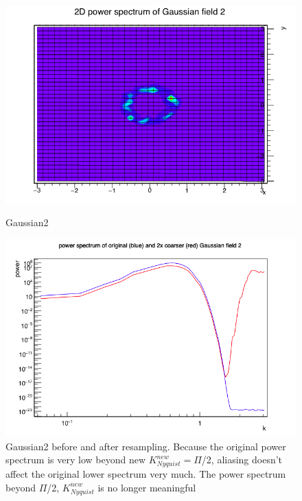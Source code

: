 
 \begin{figure}[!htbp]
\centering
\begin{minipage}{.5\textwidth}
  \centering
  \includegraphics[width=1\linewidth]{gau2color}
  \caption{Gaussian2}
  \label{2col}
\end{minipage}%
\begin{minipage}{.5\textwidth}
  \centering
  \includegraphics[width=1.1\linewidth]{2BC2}
  \caption{Gaussian2 before and after resampling. Because the original power spectrum is very low beyond new $K^{new}_{Nyquist} =\Pi$/2, aliasing doesn't affect the original  lower spectrum very much. The power spectrum beyond $\Pi$/2, $K^{new}_{Nyquist}$ is no longer meaningful }
  \label{2BC2}
\end{minipage}
\end{figure}



